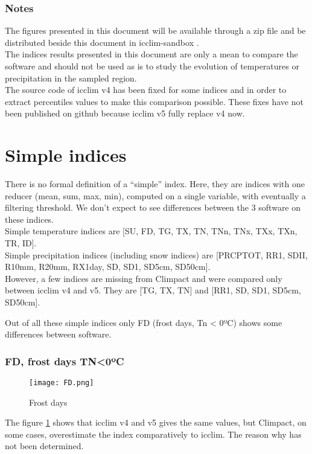 \documentclass[a4paper,11pt]{article}
\begin{document}
    \section{Notes}
        The figures presented in this document will be available through a zip file and be distributed beside this document in icclim-sandbox \cite{gh/icclim_sandbox}.\\
        The indices results presented in this document are only a mean to compare the software and should not be used as is to study the evolution of temperatures or precipitation in the sampled region.\\
        The source code of icclim v4 has been fixed for some indices and in order to extract percentiles values to make this comparison possible. These fixes have not been published on github because icclim v5 fully replace v4 now.


\part{Simple indices}
    There is no formal definition of a “simple” index. Here, they are indices with one reducer (mean, sum, max, min), computed on a single variable, with eventually a filtering threshold. We don't expect to see differences between the 3 software on these indices.\\
    Simple temperature indices are [SU, FD, TG, TX, TN, TNn, TNx, TXx, TXn, TR, ID].\\
    Simple precipitation indices (including snow indices) are [PRCPTOT, RR1, SDII, R10mm, R20mm, RX1day, SD, SD1, SD5cm, SD50cm].\\

    However, a few indices are missing from Climpact and were compared only between icclim v4 and v5. 
    They are [TG, TX, TN] and [RR1, SD, SD1, SD5cm, SD50cm].

    Out of all these simple indices only FD (frost days, Tn < 0ºC) shows some differences between software.

    \section{FD, frost days TN<0ºC}
        \begin{figure}[h]
            \centering
            \texttt{[image: FD.png]}
            \caption{Frost days}
            \label{figure/fd}
        \end{figure}
        The figure \ref{figure/fd} shows that icclim v4 and v5 gives the same values, but Climpact, on some cases, overestimate the index comparatively to icclim.
        The reason why has not been determined.
        
\end{document}
